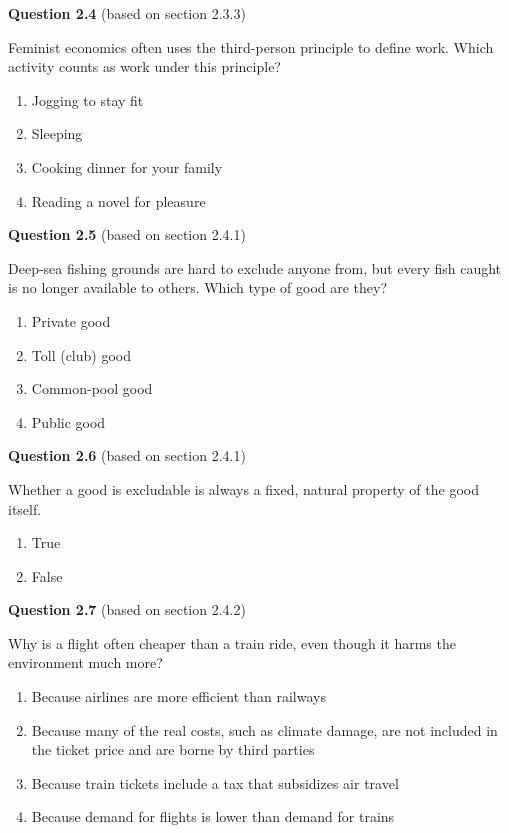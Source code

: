 \documentclass[
  british,
  a4paper,
  DIV=11,
  numbers=noendperiod,
  oneside,
  openany]{scrreprt}
\providecommand{\tightlist}{%
  \setlength{\itemsep}{0pt}\setlength{\parskip}{0pt}}
\begin{document}
\textbf{Question 2.4} (based on section 2.3.3)

Feminist economics often uses the third-person principle to define work.
Which activity counts as work under this principle?

\begin{enumerate}
\def\labelenumi{\alph{enumi})}
\tightlist
\item
  Jogging to stay fit
\item
  Sleeping
\item
  Cooking dinner for your family
\item
  Reading a novel for pleasure
\end{enumerate}

\textbf{Question 2.5} (based on section 2.4.1)

Deep-sea fishing grounds are hard to exclude anyone from, but every fish
caught is no longer available to others. Which type of good are they?

\begin{enumerate}
\def\labelenumi{\alph{enumi})}
\tightlist
\item
  Private good
\item
  Toll (club) good
\item
  Common-pool good
\item
  Public good
\end{enumerate}

\textbf{Question 2.6} (based on section 2.4.1)

Whether a good is excludable is always a fixed, natural property of the
good itself.

\begin{enumerate}
\def\labelenumi{\alph{enumi})}
\tightlist
\item
  True
\item
  False
\end{enumerate}

\textbf{Question 2.7} (based on section 2.4.2)

Why is a flight often cheaper than a train ride, even though it harms
the environment much more?

\begin{enumerate}
\def\labelenumi{\alph{enumi})}
\tightlist
\item
  Because airlines are more efficient than railways
\item
  Because many of the real costs, such as climate damage, are not
  included in the ticket price and are borne by third parties
\item
  Because train tickets include a tax that subsidizes air travel
\item
  Because demand for flights is lower than demand for trains
\end{enumerate}
\end{document}
